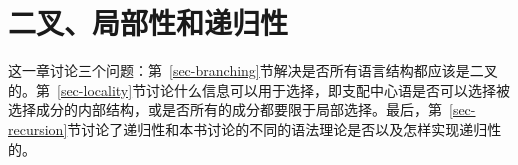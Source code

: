 
\chapter{二叉、局部性和递归性}

这一章讨论三个问题：第~\ref{sec-branching}节解决是否所有语言结构都应该是二叉的。第~\ref{sec-locality}节讨论什么信息可以用于选择，即支配中心语是否可以选择被选择成分的内部结构，或是否所有的成分都要限于局部选择。最后，第~\ref{sec-recursion}节讨论了递归性和本书讨论的不同的语法理论是否以及怎样实现递归性的。




